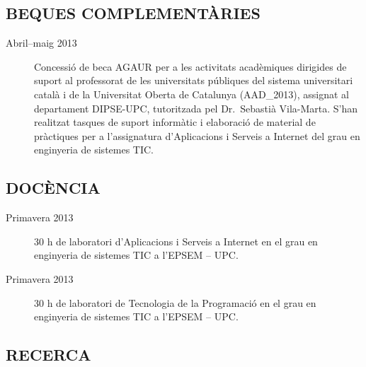 

\subsection*{BEQUES COMPLEMENTÀRIES}

\begin{description}

\item[Abril--maig 2013] Concessió de beca AGAUR per a les activitats
  acadèmiques dirigides de suport al professorat de les universitats
  públiques del sistema universitari català i de la Universitat Oberta
  de Catalunya (AAD\_2013), assignat al departament DIPSE-UPC,
  tutoritzada pel Dr.\ Sebastià Vila-Marta.  S'han realitzat tasques
  de suport informàtic i elaboració de material de pràctiques per a
  l'assignatura d'Aplicacions i Serveis a Internet del grau en
  enginyeria de sistemes TIC.
\end{description}


\subsection*{DOCÈNCIA}

\begin{description}

\item[Primavera 2013] 30 h de laboratori d'Aplicacions i Serveis a
  Internet en el grau en enginyeria de sistemes TIC a l'EPSEM -- UPC.

\item[Primavera 2013] 30 h de laboratori de Tecnologia de la
  Programació en el grau en enginyeria de sistemes TIC a l'EPSEM --
  UPC.

\end{description}




\subsection*{RECERCA}

